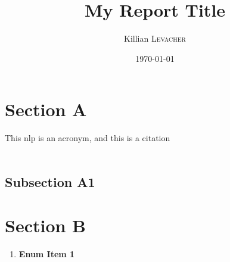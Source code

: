 \documentclass{article}
\title{My Report Title} %
\author{Killian \textsc{Levacher}} %
\date{\today} %
\begin{document}
\maketitle %



\section{Section A}
\label{sectionLabel}

This \gls{nlp} is an acronym, and this \cite{Derczynski2015} is a citation \\ \\
\lipsum[1-2] 

\subsection{Subsection A1}
\lipsum[1-1] 

\section{Section B}



\begin{enumerate}[label=\bfseries \arabic*:]
  \item \textbf{Enum Item 1} \lipsum*[1-1] 

\end{enumerate}

 



\printbibliography

\end{document}
